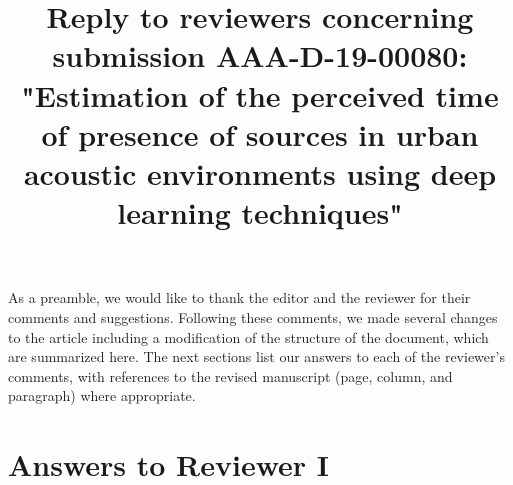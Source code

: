 \documentclass[10pt]{article}
\title{Reply to reviewers concerning submission AAA-D-19-00080: "Estimation of the perceived time of presence of sources in urban acoustic environments using deep learning techniques"}
\begin{document}
\maketitle

As a preamble, we would like to thank the editor and the reviewer for their comments and suggestions. Following these comments, we made several changes to the article including a modification of the structure of the document, which are summarized here. The next sections list our answers to each of the reviewer’s comments, with references to the revised manuscript (page, column, and paragraph) where appropriate.


\section{Answers to Reviewer I}
\end{document}
